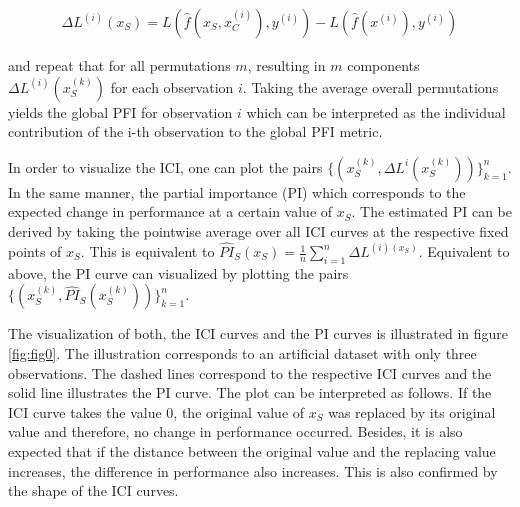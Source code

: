 \documentclass[]{krantz}
\begin{document}
\begin{align}
\Delta L^{(i)}(x_{S}) = L(\hat{f}(x_{S}, x_{C}^{(i)}), y^{(i)}) - L(\hat{f}(x^{(i)}), y^{(i)})  \label{eq:eq8}\tag{8}
\end{align}

and repeat that for all permutations \(m\), resulting in \(m\)
components \(\Delta L^{(i)}(x_{S}^{(k)})\) for each observation \(i\).
Taking the average overall permutations yields the global PFI for
observation \(i\) which can be interpreted as the individual
contribution of the i-th observation to the global PFI metric.

In order to visualize the ICI, one can plot the pairs
\(\Big\{(x_{S}^{(k)}, \Delta L^{i}(x_{S}^{(k)}))\Big\}_{k = 1}^{n}\). In
the same manner, the partial importance (PI) which corresponds to the
expected change in performance at a certain value of \(x_{S}\). The
estimated PI can be derived by taking the pointwise average over all ICI
curves at the respective fixed points of \(x_{S}\). This is equivalent
to
\(\widehat{PI}_{S}(x_{S}) = \frac{1}{n}\sum_{i = 1}^{n} \Delta L^{(i) (x_{S})}\).
Equivalent to above, the PI curve can visualized by plotting the pairs
\(\Big\{(x_{S}^{(k)}, \widehat{PI}_{S}(x_{S}^{(k)}))\Big\}_{k = 1}^{n}\).

The visualization of both, the ICI curves and the PI curves is
illustrated in figure \ref{fig:fig0}. The illustration corresponds to an
artificial dataset with only three observations. The dashed lines
correspond to the respective ICI curves and the solid line illustrates
the PI curve. The plot can be interpreted as follows. If the ICI curve
takes the value 0, the original value of \(x_{S}\) was replaced by its
original value and therefore, no change in performance occurred.
Besides, it is also expected that if the distance between the original
value and the replacing value increases, the difference in performance
also increases. This is also confirmed by the shape of the ICI curves.
\end{document}
